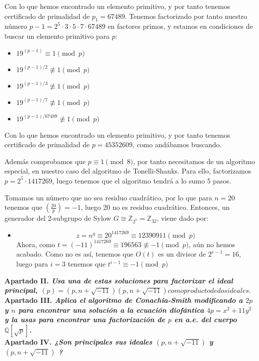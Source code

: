 \documentclass[fleqn]{article}
\def\Z{\mathds{Z}}
\def\Q{\mathds{Q}}
\begin{document}
    Con lo que hemos encontrado un elemento primitivo, y por tanto tenemos certificado de primalidad de $p_1 = 67489$.
    Tenemos factorizado por tanto nuestro número $p-1 = 2^5 \cdot 3 \cdot 5 \cdot 7 \cdot 67489$ en factores primos, y estamos en condiciones de buscar un elemento 
    primitivo para $p$:

    \begin{itemize}
        \item $19^{(p - 1)} \equiv 1 \pmod{p}$
        \item $19^{(p - 1)/2} \not\equiv 1 \pmod{p}$    
        \item $19^{(p - 1)/3} \not\equiv 1 \pmod{p}$
        \item $19^{(p - 1)/7} \not\equiv 1 \pmod{p}$
        \item $19^{(p - 1)/67489} \not\equiv 1 \pmod{p}$
    \end{itemize}

    Con lo que hemos encontrado un elemento primitivo, y por tanto tenemos certificado de primalidad de $p = 45352609$, como andábamos buscando.
    
    Además comprobamos que $p \equiv 1 \pmod{8}$, por tanto necesitamos de un algoritmo especial, en nuestro caso del algoritmo de Tonelli-Shanks.
    Para ello, factorizamos $p = 2^5 \cdot 1417269$, luego tenemos que el algoritmo tendrá a lo sumo 5 pasos.

    Tomamos un número que no sea residuo cuadrático, por lo que para $n=20$ tenemos que $\left(\frac{20}{p}\right) = -1$, luego 20 no es residuo cuadrático.
    Entonces, un generador del 2-subgrupo de Sylow $ G \cong \Z_{2^5} = \Z_{32}$, viene dado por:
    \begin{itemize}
        \item $$z = n^q \equiv 20^{1417269} \equiv 12390911 \pmod{p}$$
                Ahora, como $t = (-11)^1417269 \equiv 196563 \not\equiv -1 \pmod{p}$, aún no hemos acabado. 
                Como no es así, tenemos que $O(t)$ es un divisor de $2^{e-1}=16$, luego para $i = 3$ tenemos que
                $t^{i-1} \equiv -1 \pmod{p} $
    \end{itemize}





    \newpage
    \textbf{Apartado II. \textit{Usa una de estas soluciones para factorizar el ideal principal, 
                                $(p) = (p, n+ \sqrt{-11})(p, n+ \sqrt{-11}) como producto de dos ideales.$}}\\

    \newpage
    \textbf{Apartado III. \textit{Aplica el algoritmo de Conachia-Smith modificando a $2p$ y $n$ para encontrar
                                una solución a la ecuación diofántica $4p = x^2 + 11y^2 $ y la usas para encontrar 
                                una factorización de $p$ en a.e. del cuerpo $\Q[\sqrt{p}]$.}} \\


    \newpage
    \textbf{Apartado IV. \textit{¿Son principales sus ideales $(p, n+ \sqrt{-11})$ y $(p, n+ \sqrt{-11})$ ?}}\\
\end{document}
